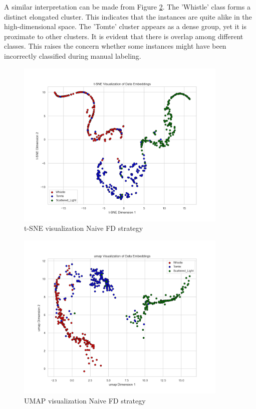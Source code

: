 A similar interpretation can be made from Figure \ref{fig:umap_FD_Naive}. The 'Whistle' class forms a distinct elongated cluster. This indicates that the instances are quite alike in the high-dimensional space. The 'Tomte' cluster appears as a dense group, yet it is proximate to other clusters. It is evident that there is overlap among different classes. This raises the concern whether some instances might have been incorrectly classified during manual labeling. 

\begin{figure}[ht]
  \centering
    \includegraphics[width=0.9\textwidth]{Grad Assignment/Images/tSNE_FractalDimension_naive_test.png}
    \caption{t-SNE visualization Naive FD strategy}
    \label{fig:tSNE_FD_Naive}
\end{figure}

\begin{figure}[H]
  \centering
    \includegraphics[width=0.9\textwidth]{Grad Assignment/Images/umap_FractalDimension_naive_test.png}
    \caption{UMAP visualization Naive FD strategy}
    \label{fig:umap_FD_Naive}
\end{figure}


